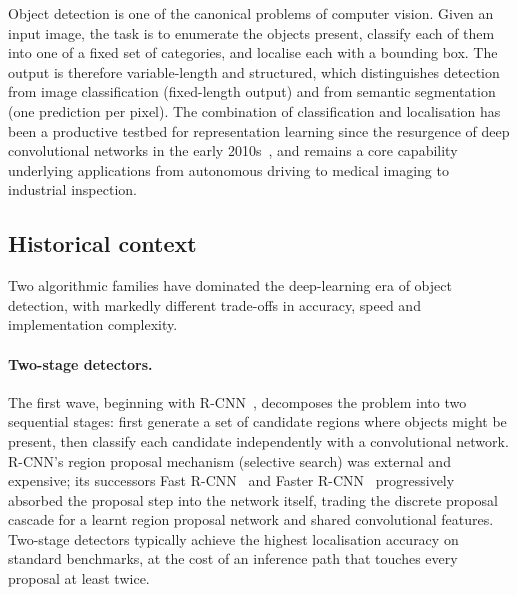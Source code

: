 
Object detection is one of the canonical problems of computer vision. Given
an input image, the task is to enumerate the objects present, classify each
of them into one of a fixed set of categories, and localise each with a
bounding box. The output is therefore variable-length and structured, which
distinguishes detection from image classification (fixed-length output) and
from semantic segmentation (one prediction per pixel). The combination of
classification and localisation has been a productive testbed for
representation learning since the resurgence of deep convolutional networks
in the early 2010s~\citep{krizhevsky2012imagenet,russakovsky2015imagenet},
and remains a core capability underlying applications from autonomous
driving to medical imaging to industrial inspection.

\subsection{Historical context}
\label{sec:intro:history}

Two algorithmic families have dominated the deep-learning era of object
detection, with markedly different trade-offs in accuracy, speed and
implementation complexity.

\paragraph{Two-stage detectors.}
The first wave, beginning with R-CNN~\citep{girshick2014rich}, decomposes the
problem into two sequential stages: first generate a set of candidate
regions where objects might be present, then classify each candidate
independently with a convolutional network. R-CNN's region proposal
mechanism (selective search) was external and expensive; its successors
Fast R-CNN~\citep{girshick2015fast} and
Faster R-CNN~\citep{ren2015faster} progressively absorbed the proposal step
into the network itself, trading the discrete proposal cascade for a learnt
region proposal network and shared convolutional features. Two-stage
detectors typically achieve the highest localisation accuracy on standard
benchmarks, at the cost of an inference path that touches every proposal at
least twice.

